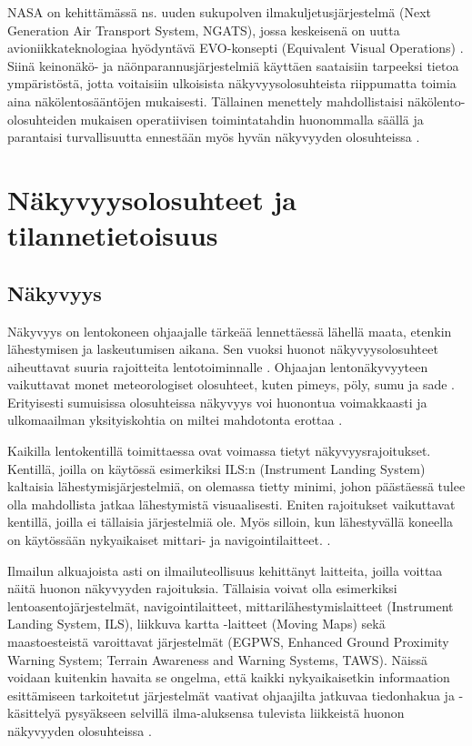 \documentclass[utf8,bachelor,manualbib]{gradu3}
\begin{document}
NASA on kehittämässä ns. uuden sukupolven ilmakuljetusjärjestelmä (Next Generation Air Transport System, NGATS), jossa keskeisenä on uutta avioniikkateknologiaa hyödyntävä EVO-konsepti (Equivalent Visual Operations) \citep{baileyym2007}. Siinä keinonäkö- ja näönparannusjärjestelmiä käyttäen saataisiin tarpeeksi tietoa ympäristöstä, jotta voitaisiin ulkoisista näkyvyysolosuhteista riippumatta toimia aina näkölentosääntöjen mukaisesti. Tällainen menettely mahdollistaisi näkölento-olosuhteiden mukaisen operatiivisen toimintatahdin huonommalla säällä ja parantaisi turvallisuutta ennestään myös hyvän näkyvyyden olosuhteissa \citep{prinzelym2013}.

\chapter{Näkyvyysolosuhteet ja tilannetietoisuus}

\section{Näkyvyys}

Näkyvyys on lentokoneen ohjaajalle tärkeää lennettäessä lähellä maata, etenkin lähestymisen ja laskeutumisen aikana. Sen vuoksi huonot näkyvyysolosuhteet aiheuttavat suuria rajoitteita lentotoiminnalle \citep{mollersachs1994, prinzelym2013}. Ohjaajan lentonäkyvyyteen vaikuttavat monet meteorologiset olosuhteet, kuten pimeys, pöly, sumu ja sade \citep{wickensalexander2009}. Erityisesti sumuisissa olosuhteissa näkyvyys voi huonontua voimakkaasti ja ulkomaailman yksityiskohtia on miltei mahdotonta erottaa \citep{beiergemperlein2004}.

Kaikilla lentokentillä toimittaessa ovat voimassa tietyt näkyvyysrajoitukset. Kentillä, joilla on käytössä esimerkiksi ILS:n (Instrument Landing System) kaltaisia lähestymisjärjestelmiä, on olemassa tietty minimi, johon päästäessä tulee olla mahdollista jatkaa lähestymistä visuaalisesti. Eniten rajoitukset vaikuttavat kentillä, joilla ei tällaisia järjestelmiä ole. Myös silloin, kun lähestyvällä koneella on käytössään nykyaikaiset mittari- ja navigointilaitteet. \citep{mollersachs1994}.

Ilmailun alkuajoista asti on ilmailuteollisuus kehittänyt laitteita, joilla voittaa näitä huonon näkyvyyden rajoituksia. Tällaisia voivat olla esimerkiksi lentoasentojärjestelmät, navigointilaitteet, mittarilähestymislaitteet (Instrument Landing System, ILS), liikkuva kartta -laitteet (Moving Maps) sekä maastoesteistä varoittavat järjestelmät (EGPWS, Enhanced Ground Proximity Warning System; Terrain Awareness and Warning Systems, TAWS). Näissä voidaan kuitenkin havaita se ongelma, että kaikki nykyaikaisetkin informaation esittämiseen tarkoitetut järjestelmät vaativat ohjaajilta jatkuvaa tiedonhakua ja -käsittelyä pysyäkseen selvillä ilma-aluksensa tulevista liikkeistä huonon näkyvyyden olosuhteissa \citep {prinzelym2004}.
\end{document}
